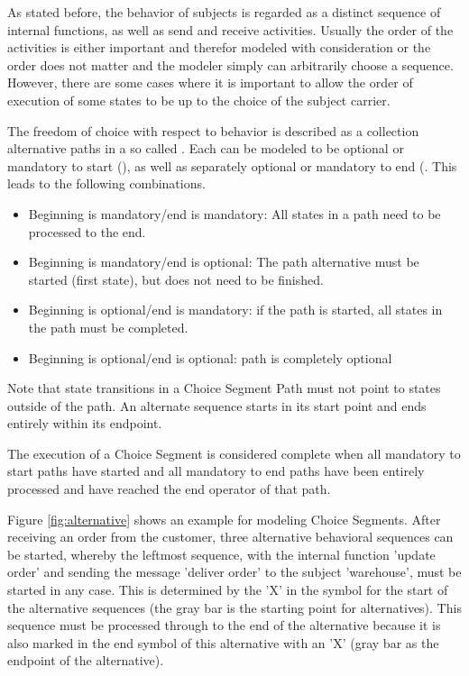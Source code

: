 As stated before, the behavior of subjects is regarded as a distinct sequence of internal functions, as well as send and receive activities. Usually the order of the activities is either important and therefor modeled with consideration or the order does not matter and the modeler simply can arbitrarily choose a sequence. However, there are some cases where it is important to allow the order of execution of some states to be up to the choice of the subject carrier.

The freedom of choice with respect to behavior is described as a collection alternative paths in a so called . Each  can be modeled to be optional or mandatory to start (), as well as separately optional or mandatory to end (. This leads to the following combinations.

\begin{itemize}
	\item Beginning is mandatory/end is mandatory: All states in a path need to be processed to the end.
	\item Beginning is mandatory/end is optional: The path alternative must be started (first state), but does not need to be finished. 
	\item Beginning is optional/end is mandatory: if the path is started, all states in the path must be completed.
	\item Beginning is optional/end is optional: path is completely optional
\end{itemize}

Note that state transitions in a Choice Segment Path must not point to states outside of the path. An alternate sequence starts in its start point and ends entirely within its endpoint.

The execution of a Choice Segment is considered complete when all mandatory to start paths have started and all mandatory to end paths have been entirely processed and have reached the end operator of that path.

Figure \ref{fig:alternative} shows an example for modeling Choice Segments. After receiving an order from the customer, three alternative behavioral sequences can be started, whereby the leftmost sequence, with the internal function 'update order' and sending the message 'deliver order' to the subject 'warehouse', must be started in any case. This is determined by the 'X' in the symbol for the start of the alternative sequences (the gray bar is the starting point for alternatives). This sequence must be processed through to the end of the alternative because it is also marked in the end symbol of this alternative with an 'X' (gray bar as the endpoint of the alternative).

